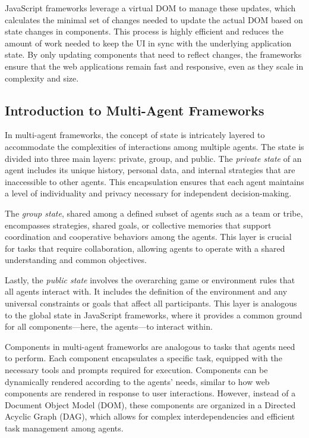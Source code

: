 JavaScript frameworks leverage a virtual DOM to manage these updates, which calculates the minimal set of changes needed to update the actual DOM based on state changes in components. This process is highly efficient and reduces the amount of work needed to keep the UI in sync with the underlying application state. By only updating components that need to reflect changes, the frameworks ensure that the web applications remain fast and responsive, even as they scale in complexity and size.


\subsection{Introduction to Multi-Agent Frameworks}

In multi-agent frameworks, the concept of state is intricately layered to accommodate the complexities of interactions among multiple agents. The state is divided into three main layers: private, group, and public. The \textit{private state} of an agent includes its unique history, personal data, and internal strategies that are inaccessible to other agents. This encapsulation ensures that each agent maintains a level of individuality and privacy necessary for independent decision-making.

The \textit{group state}, shared among a defined subset of agents such as a team or tribe, encompasses strategies, shared goals, or collective memories that support coordination and cooperative behaviors among the agents. This layer is crucial for tasks that require collaboration, allowing agents to operate with a shared understanding and common objectives.

Lastly, the \textit{public state} involves the overarching game or environment rules that all agents interact with. It includes the definition of the environment and any universal constraints or goals that affect all participants. This layer is analogous to the global state in JavaScript frameworks, where it provides a common ground for all components—here, the agents—to interact within.

Components in multi-agent frameworks are analogous to tasks that agents need to perform. Each component encapsulates a specific task, equipped with the necessary tools and prompts required for execution. Components can be dynamically rendered according to the agents’ needs, similar to how web components are rendered in response to user interactions. However, instead of a Document Object Model (DOM), these components are organized in a Directed Acyclic Graph (DAG), which allows for complex interdependencies and efficient task management among agents.

